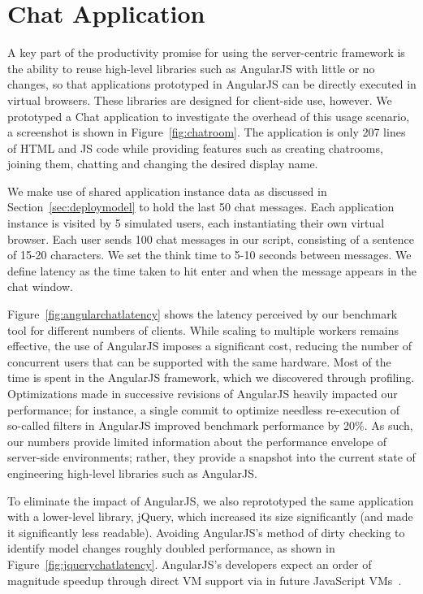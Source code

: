\section{Chat Application} 

A key part of the productivity promise for using the server-centric \cb framework
is the ability to reuse high-level libraries such as AngularJS with little or
no changes, so that applications prototyped in AngularJS can be directly
executed in virtual browsers. These libraries are designed for client-side
use, however. We prototyped a Chat application to investigate the overhead
of this usage scenario, a screenshot is shown in Figure~\ref{fig:chatroom}.  
The application is only 207 lines of HTML and JS code while providing features such as 
creating chatrooms, joining them, chatting and changing the desired display name.

\chatroomfig{}

We make use of shared application instance data as discussed in Section~\ref{sec:deploymodel}
to hold the last 50 chat messages.  Each application instance is visited by 5 simulated users,
each instantiating their own virtual browser.  Each user sends 100 chat messages in our
script, consisting of a sentence of 15-20 characters.  We set the think time to 5-10 seconds
between messages.  We define latency as the time taken to hit enter and when the  message
appears in the chat window.

\angularchatlatency{}

Figure~\ref{fig:angularchatlatency} shows the latency perceived by our benchmark tool
for different numbers of clients.  While scaling to multiple workers remains effective,
the use of AngularJS imposes a significant cost, reducing the number of concurrent users 
that can be supported with the same hardware. Most of the time is spent in the AngularJS
framework, which we discovered through profiling. Optimizations made in successive revisions
of AngularJS heavily impacted our performance; for instance, a single commit to optimize
needless re-execution of so-called filters in AngularJS improved benchmark performance by 20\%.
As such, our numbers provide limited information about the performance envelope of
server-side environments; rather, they provide a snapshot into the current state of
engineering high-level libraries such as AngularJS.  

\jquerychatlatency{}
To eliminate the impact of AngularJS, we also reprototyped the same application with a
lower-level library, jQuery, which increased its size significantly (and made it significantly
less readable).  Avoiding AngularJS's method of dirty checking to identify model changes
roughly doubled performance, as shown in Figure~\ref{fig:jquerychatlatency}.
AngularJS's developers expect an order of magnitude speedup through direct VM 
support via  in future JavaScript VMs~\cite{angularjsspeedup}.

